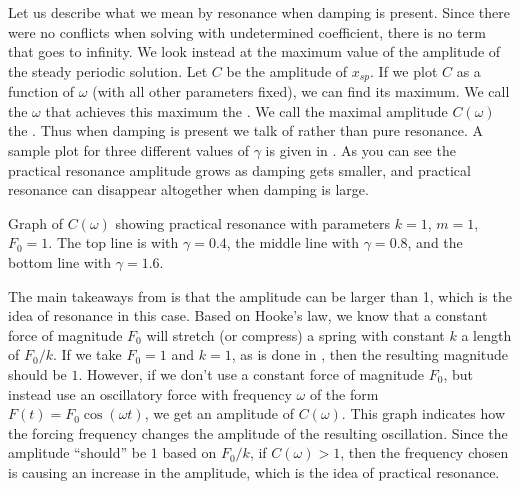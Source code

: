 Let us describe what we mean by resonance when damping is present.
Since there were no conflicts when solving with undetermined coefficient,
there is no term that goes to infinity.  We look instead at the
maximum value of the amplitude of the steady periodic solution.
Let $C$ be the amplitude of $x_{sp}$.
If we plot $C$ as a function of $\omega$ (with all other
parameters fixed), we can find its maximum.
We call the $\omega$ that achieves this maximum
the \emph{}.
We call the maximal amplitude $C(\omega)$
the \emph{}.
Thus when damping is present we talk of \emph{}
rather than pure resonance.
A sample plot for three different
values of $\gamma$ is given in .  As you can see the
practical resonance amplitude grows as damping gets smaller, and 
practical resonance can disappear altogether when damping is large.

\begin{myfig}
\capstart
{}
\caption{Graph of $C(\omega)$ showing practical resonance with parameters
$k=1$, $m=1$, $F_0 = 1$. The top line is with $\gamma=0.4$, the middle line with
$\gamma=0.8$, and the bottom line with
$\gamma=1.6$.\label{3.6:pracresfig}}
\end{myfig}

The main takeaways from  is that the amplitude can be larger than 1, which is the idea of resonance in this case. Based on Hooke's law, we know that a constant force of magnitude $F_0$ will stretch (or compress) a spring with constant $k$ a length of $F_0/k$. If we take $F_0 = 1$ and $k=1$, as is done in , then the resulting magnitude should be $1$. However, if we don't use a constant force of magnitude $F_0$, but instead use an oscillatory force with frequency $\omega$ of the form $F(t) = F_0 \cos{(\omega t)}$, we get an amplitude of $C(\omega)$. This graph indicates how the forcing frequency changes the amplitude of the resulting oscillation. Since the amplitude ``should'' be $1$ based on $F_0/k$, if $C(\omega) > 1$, then the frequency chosen is causing an increase in the amplitude, which is the idea of practical resonance. 

